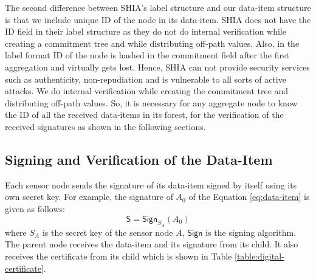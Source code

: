 	The second difference between SHIA's label structure and our data-item structure is that we include unique ID of the node in its data-item.
	SHIA does not have the ID field in their label structure as they do not do internal verification while creating a commitment tree and while distributing off-path values.
	Also, in the label format ID of the node is hashed in the commitment field after the first aggregation and virtually gets lost.
	Hence, SHIA can not provide security services such as authenticity, non-repudiation and is vulnerable to all sorts of active attacks.
	We do internal verification while creating the commitment tree and distributing off-path values.
	So, it is necessary for any aggregate node to know the ID of all the received data-items in its forest, for the verification of the received signatures as shown in the following sections.

	\subsection{Signing and Verification of the Data-Item}
		\label{subsection:Signing and Verification of the Data-Item}
		Each sensor node sends the signature of its data-item signed by itself using its own secret key. 
		For example, the signature of $A_{0}$ of the Equation \ref{eq:data-item} is given as follows:
		\begin{equation}
			\label{eq:sign-data-item}
			\textsf{S} = \textsf{Sign}_{S_{A}}(A_{0})
		\end{equation}
		where $S_{A}$ is the secret key of the sensor node $A$, $\textsf{Sign}$ is the signing algorithm.
		The parent node receives the data-item and its signature from its child. 
		It also receives the certificate from its child which is shown in Table \ref{table:digital-certificate}.
		
